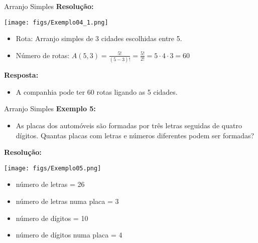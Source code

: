 \documentclass[aspectratio=169]{beamer}
\begin{document}
\begin{frame}{Arranjo Simples}
    \textbf{Resolução:}
    \vspace{2mm}

    \begin{center}
        \texttt{[image: figs/Exemplo04\_1.png]}
    \end{center}

    \pause
    \begin{itemize}
        \item Rota: Arranjo simples de 3 cidades escolhidas entre 5. \pause
        \item Número de rotas: $A(5,3) = \frac{5!}{(5-3)!} = \frac{5!}{2!} = 5 \cdot 4 \cdot 3 = 60$ 
    \end{itemize}

    \vspace{2mm}
    \pause
    \textbf{Resposta:}
    
    \begin{itemize}
        \item[] A companhia pode ter 60 rotas ligando as 5 cidades.
    \end{itemize}
\end{frame}


\begin{frame}{Arranjo Simples}
    \textbf{Exemplo 5:}
    \vspace{2mm}

    \begin{itemize}
        \item[] As placas dos automóveis são formadas por três letras seguidas de quatro dígitos. Quantas placas com letras e números diferentes podem ser formadas?
    \end{itemize}

    \vspace{2mm}
    \pause
    \textbf{Resolução:}
    
    \begin{multicols}{2}
        \begin{center}
            \texttt{[image: figs/Exemplo05.png]}
        \end{center}
        
        \pause
        \columnbreak

        \begin{itemize}
            \item[] número de letras = 26 \pause
            \item[] número de letras numa placa = 3 \pause
            \item[] número de dígitos = 10 \pause
            \item[] número de dígitos numa placa = 4
        \end{itemize}
    \end{multicols}

    
\end{frame}
\end{document}

